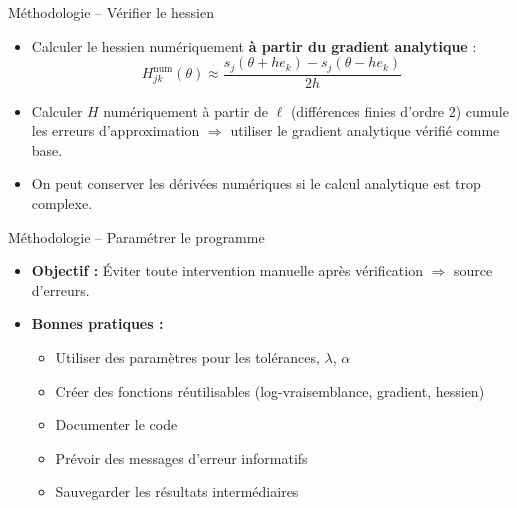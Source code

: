 \documentclass[11pt,aspectratio=169]{beamer}
\begin{document}
\begin{frame}{Méthodologie -- Vérifier le hessien}

\begin{itemize}

\item Calculer le hessien numériquement \textbf{à partir du gradient analytique} :
  \[
  H_{jk}^{\text{num}}(\theta) \approx \frac{s_j(\theta + h e_k) - s_j(\theta - h e_k)}{2h}
  \]

\item Calculer $H$ numériquement à partir de $\ell$ (différences finies d'ordre 2) cumule les erreurs d'approximation $\Rightarrow$ utiliser le gradient analytique vérifié comme base.\newline

\item On peut conserver les dérivées numériques si le calcul analytique est trop complexe.

\end{itemize}

\end{frame}

\begin{frame}{Méthodologie -- Paramétrer le programme}

\begin{itemize}

\item \textbf{Objectif :} Éviter toute intervention manuelle après vérification $\Rightarrow$ source d'erreurs.\newline

\item \textbf{Bonnes pratiques :}
  \begin{itemize}
    \item Utiliser des paramètres pour les tolérances, $\lambda$, $\alpha$\newline
    \item Créer des fonctions réutilisables (log-vraisemblance, gradient, hessien)\newline
    \item Documenter le code\newline
    \item Prévoir des messages d'erreur informatifs\newline
    \item Sauvegarder les résultats intermédiaires
  \end{itemize}

\end{itemize}

\end{frame}
\end{document}
